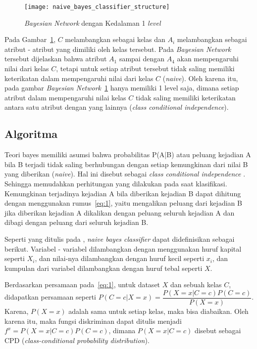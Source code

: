 \begin{figure}[H]
\centering
\texttt{[image: naive\_bayes\_classifier\_structure]}
\caption[\textit{Bayesian Network} dengan Kedalaman 1 \textit{level}]{\textit{Bayesian Network} dengan Kedalaman 1 \textit{level}}
\label{fig:Struktur Naive Bayesian Network}
\end{figure}

	Pada Gambar~\ref{fig:Struktur Naive Bayesian Network}, $C$ melambangkan sebagai kelas dan $A_i$ melambangkan sebagai atribut - atribut yang dimiliki oleh kelas tersebut. Pada \textit{Bayesian Network} tersebut dijelaskan bahwa atribut $A_1$ sampai dengan $A_4$ akan mempengaruhi nilai dari kelas $C$, tetapi untuk setiap atribut tersebut tidak saling memiliki keterikatan dalam mempengaruhi nilai dari kelas $C$ (\textit{naive}). Oleh karena itu, pada gambar \textit{Bayesian Network}~\ref{fig:Struktur Naive Bayesian Network} hanya memiliki 1 level saja, dimana setiap atribut dalam mempengaruhi nilai kelas $C$ tidak saling memiliki keterikatan antara satu atribut dengan yang lainnya (\textit{class conditional independence}).

\subsection{Algoritma}

	 Teori bayes memiliki asumsi bahwa probabilitas P(A|B) atau peluang kejadian A bila B terjadi tidak saling berhubungan dengan setiap kemungkinan dari nilai B yang diberikan (\textit{naive}). Hal ini disebut sebagai \textit{class conditional independence} . Sehingga memudahkan perhitungan yang dilakukan pada saat klasifikasi. Kemungkinan terjadinya kejadian A bila diberikan kejadian B dapat dihitung dengan menggunakan rumus~\ref{eq:1}, yaitu mengalikan peluang dari kejadian B jika diberikan kejadian A dikalikan dengan peluang seluruh kejadian A dan dibagi dengan peluang dari seluruh kejadian B.

	Seperti yang ditulis pada \cite{rish2001empirical}, \textit{naive bayes classifier} dapat didefinisikan sebagai berikut. Variabel - variabel dilambangkan dengan menggunakan huruf kapital seperti $X_i$, dan nilai-nya dilambangkan dengan huruf kecil seperti $x_i$, dan kumpulan dari variabel dilambangkan dengan huruf tebal seperti \textbf{$X$}.

Berdasarkan persamaan pada~\ref{eq:1}, untuk dataset $X$ dan sebuah kelas $C$, didapatkan persamaan seperti $P(C=c|X=x) = \dfrac{P(X=x|C=c)P(C=c)}{P(X=x)}$. Karena, $P(X=x)$ adalah sama untuk setiap kelas, maka bisa diabaikan. Oleh karena itu, maka fungsi diskriminan dapat ditulis menjadi $f^x = P(X=x|C=c)P(C=c)$, dimana $P(X=x|C=c)$ disebut sebagai CPD (\textit{class-conditional probability distribution}).

